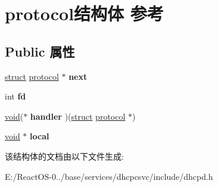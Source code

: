 \hypertarget{structprotocol}{}\section{protocol结构体 参考}
\label{structprotocol}
\subsection*{Public 属性}
\begin{DoxyCompactItemize}
\item 
\mbox{\label{structprotocol_a7350a90bfe1a4f3a65424820e7c5225f}} 
\hyperlink{interfacestruct}{struct} \hyperlink{structprotocol}{protocol} $\ast$ {\bfseries next}
\item 
\mbox{\label{structprotocol_aa6c75b99932e96fa7e5ff734d1880205}} 
int {\bfseries fd}
\item 
\mbox{\label{structprotocol_a986785e96aa0e6502f3be17aafd21cf4}} 
\hyperlink{interfacevoid}{void}($\ast$ {\bfseries handler} )(\hyperlink{interfacestruct}{struct} \hyperlink{structprotocol}{protocol} $\ast$)
\item 
\mbox{\label{structprotocol_a9d6d935026f90d4744be541c7d12658a}} 
\hyperlink{interfacevoid}{void} $\ast$ {\bfseries local}
\end{DoxyCompactItemize}


该结构体的文档由以下文件生成\+:\begin{DoxyCompactItemize}
\item 
E\+:/\+React\+O\+S-\/0../base/services/dhcpcsvc/include/dhcpd.\+h\end{DoxyCompactItemize}

